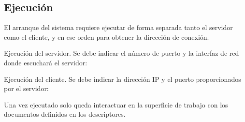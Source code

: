 \subsection{Ejecución}

El arranque del sistema requiere ejecutar de forma separada tanto el servidor como el cliente, y en
ese orden para obtener la dirección de conexión.

Ejecución del servidor. Se debe indicar el número de puerto y la interfaz de red donde escuchará el
servidor:

\begin{listing}[%
  style=consola]
$ ./argos_server <port> <iface>}
\end{listing}

Ejecución del cliente. Se debe indicar la dirección IP y el puerto proporcionados por el
servidor:


Una vez ejecutado solo queda interactuar en la superficie de trabajo con los documentos definidos
en los descriptores.

